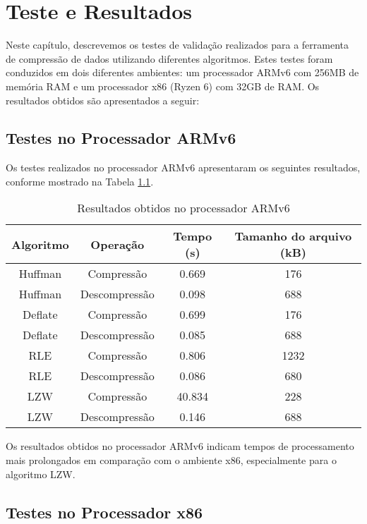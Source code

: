 \chapter{Teste e Resultados}
\label{cap:teste-resultados}

Neste capítulo, descrevemos os testes de validação realizados para a ferramenta de compressão de dados utilizando diferentes algoritmos. Estes testes foram conduzidos em dois diferentes ambientes: um processador ARMv6 com 256MB de memória RAM e um processador x86 (Ryzen 6) com 32GB de RAM. Os resultados obtidos são apresentados a seguir:

\section{Testes no Processador ARMv6}

Os testes realizados no processador ARMv6 apresentaram os seguintes resultados, conforme mostrado na Tabela \ref{tab:exemplo}.

\begin{table}[htbp]
  \centering
  \caption{Resultados obtidos no processador ARMv6}
  \begin{tabular}{|c|c|c|c|}
  \hline
  Algoritmo & Operação & Tempo (s) & Tamanho do arquivo (kB) \\
  \hline
  Huffman & Compressão & 0.669 & 176 \\
  Huffman & Descompressão & 0.098 & 688 \\
  Deflate & Compressão & 0.699 & 176 \\
  Deflate & Descompressão & 0.085 & 688 \\
  RLE & Compressão & 0.806 & 1232 \\
  RLE & Descompressão & 0.086 & 680 \\
  LZW & Compressão & 40.834 & 228 \\
  LZW & Descompressão & 0.146 & 688 \\
  \hline
  \end{tabular}
  \label{tab:exemplo}
\end{table}

Os resultados obtidos no processador ARMv6 indicam tempos de processamento mais prolongados em comparação com o ambiente x86, especialmente para o algoritmo LZW.

\section{Testes no Processador x86}

